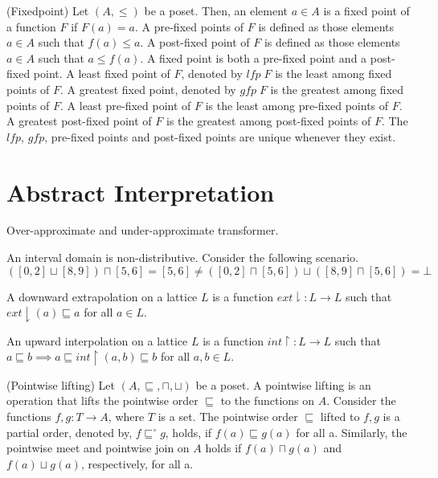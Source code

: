 \begin{definition} (Fixedpoint)
  Let $(A, \leq)$ be a poset. Then, an element $a \in A$ is a fixed point of 
  a function $F$ if $F(a)=a$. A  pre-fixed points of $F$ is defined as those
  elements $a \in A$ such that $f(a) \leq a$.  A post-fixed point of $F$ is
  defined as those elements $a \in A$ such that $a \leq f(a)$. A fixed point is
  both a pre-fixed point and a post-fixed point. 
  A least fixed point of $F$, denoted by $lfp\; F$ is the least among fixed 
  points of $F$. 
  A greatest fixed point, denoted by $gfp\; F$ is the greatest among fixed
  points of $F$.  A least pre-fixed point of $F$ is the least among pre-fixed
  points of $F$. A greatest post-fixed point of $F$ is the greatest among 
  post-fixed points of $F$.  The $lfp$, $gfp$, pre-fixed points and
  post-fixed points are unique whenever they exist.  
\end{definition}
%

\section{Abstract Interpretation}
Over-approximate and under-approximate transformer. 

\begin{example}
An interval domain is non-distributive. Consider the following scenario.
\[
   ([0,2] \sqcup [8,9]) \sqcap [5,6] = [5,6] \neq
   ([0,2] \sqcap [5,6]) \sqcup ([8,9] \sqcap [5,6]) = \bot
\]
\end{example}

\begin{definition}
A downward extrapolation on a lattice $L$ is a function $ext \downharpoonright
  \colon L \rightarrow L$ such that $ext \downharpoonright(a) \sqsubseteq a$ for
  all $a \in L$. 
\end{definition}

\begin{definition}
An upward interpolation on a lattice $L$ is a function $int \upharpoonright
  \colon L \rightarrow L$ such that $a \sqsubseteq b \implies a \sqsubseteq 
  int \upharpoonright(a,b) \sqsubseteq b$ for all $a,b \in L$. 
\end{definition}
%
\begin{definition} (Pointwise lifting)
  Let $(A, \sqsubseteq, \sqcap, \sqcup)$ be a poset.  A pointwise lifting is 
  an operation that lifts the pointwise order $\sqsubseteq$ to the functions 
  on $A$. Consider the functions $f,g \colon T \rightarrow A$, where $T$ is a set. 
  The pointwise
  order $\sqsubseteq$ lifted to $f,g$ is a partial order, denoted by, 
  $f \sqsubseteq^\circ g$, holds, if $f(a) \sqsubseteq g(a)$ for all a.
  Similarly, the pointwise meet and pointwise join on $A$ holds if 
  $f(a) \sqcap g(a)$ and $f(a) \sqcup g(a)$, respectively, for all a. 
\end{definition}
%

